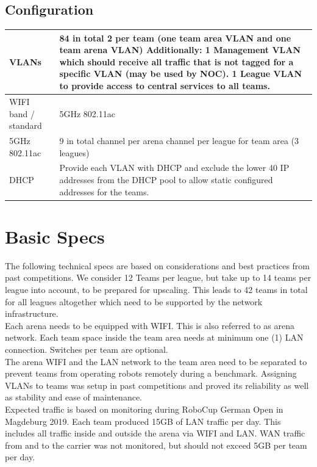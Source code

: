 \subsection{Configuration}
\begin{tabular}{|l|p{12cm}|}
\hline
VLANs & 84 in total
2 per team (one team area VLAN and one team arena VLAN)
\newline
Additionally:
1 Management VLAN which should receive all traffic that is not tagged for a specific VLAN (may be used by NOC).
1 League VLAN to provide access to central services to all teams.\\
\hline
WIFI band / standard & 5GHz 802.11ac \\
\hline
5GHz 802.11ac & 9 in total \newline
2 channel per arena \newline
1 channel per league for team area (3 leagues)\\
\hline
DHCP & Provide each VLAN with DHCP and exclude the lower 40 IP addresses from the DHCP pool to allow static configured addresses for the teams.\\
\hline
\end{tabular}

\section{Basic Specs}

The following technical specs are based on considerations and best practices from past competitions. We consider 12 Teams per league, but take up to 14 teams per league into account, to be prepared for upscaling. This leads to 42 teams in total for all leagues altogether which need to be supported by the network infrastructure.\\

Each arena needs to be equipped with WIFI. This is also referred to as arena network.
Each team space inside the team area needs at minimum one (1) LAN connection. Switches per team are optional.\\

The arena WIFI and the LAN network to the team area need to be separated to prevent teams from operating robots remotely during a benchmark. Assigning VLANs to teams was setup in past competitions and proved its reliability as well as stability and ease of maintenance.\\

Expected traffic is based on monitoring during RoboCup German Open in Magdeburg 2019.
Each team produced 15GB of LAN traffic per day. This includes all traffic inside and outside the arena via WIFI and LAN. WAN traffic from and to the carrier was not monitored, but should not exceed 5GB per team per day.\\

